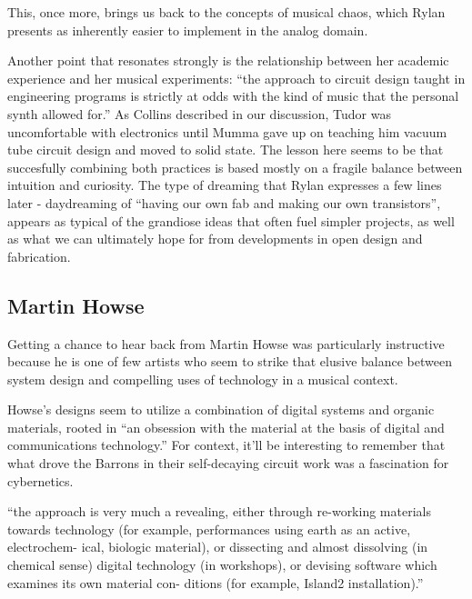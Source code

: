 This, once more, brings us back to the concepts of musical chaos, which Rylan presents as inherently easier to implement in the analog domain. 

Another point that resonates strongly is the relationship between her academic experience and her musical experiments: ``the approach to circuit design taught in engineering programs is strictly at odds with the kind of music that the personal synth allowed for.'' As Collins described in our discussion, Tudor was uncomfortable with electronics until Mumma gave up on teaching him vacuum tube circuit design and moved to solid state. The lesson here seems to be that succesfully combining both practices is based mostly on a fragile balance between intuition and curiosity. The type of dreaming that Rylan expresses a few lines later - daydreaming of ``having our own fab and making our own transistors'', appears as typical of the grandiose ideas that often fuel simpler projects, as well as what we can ultimately hope for from developments in open design and fabrication. 


\subsection{Martin Howse}

Getting a chance to hear back from Martin Howse was particularly instructive because he is one of few artists who seem to strike that elusive balance between system design and compelling uses of technology in a musical context. 

Howse's designs seem to utilize a combination of digital systems and organic materials, rooted in ``an obsession with the material at the basis of digital and communications technology.'' For context, it'll be interesting to remember that what drove the Barrons in their self-decaying circuit work was a fascination for cybernetics. 

``the approach is very much a revealing, either through re-working materials towards technology (for example, performances using earth as an active, electrochem- ical, biologic material), or dissecting and almost dissolving (in chemical sense) digital technology (in workshops), or devising software which examines its own material con- ditions (for example, Island2 installation).''

